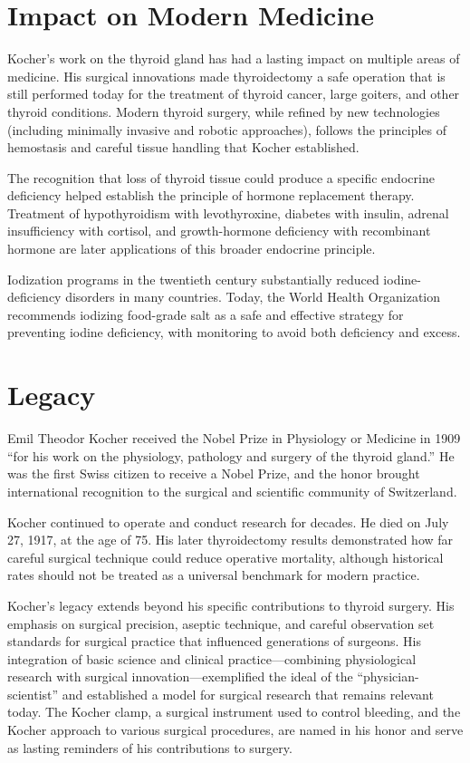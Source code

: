 \section{Impact on Modern Medicine}

Kocher's work on the thyroid gland has had a lasting impact on multiple areas of medicine. His surgical innovations made thyroidectomy a safe operation that is still performed today for the treatment of thyroid cancer, large goiters, and other thyroid conditions. Modern thyroid surgery, while refined by new technologies (including minimally invasive and robotic approaches), follows the principles of hemostasis and careful tissue handling that Kocher established.

The recognition that loss of thyroid tissue could produce a specific endocrine deficiency helped establish the principle of hormone replacement therapy. Treatment of hypothyroidism with levothyroxine, diabetes with insulin, adrenal insufficiency with cortisol, and growth-hormone deficiency with recombinant hormone are later applications of this broader endocrine principle.

Iodization programs in the twentieth century substantially reduced iodine-deficiency disorders in many countries. Today, the World Health Organization recommends iodizing food-grade salt as a safe and effective strategy for preventing iodine deficiency, with monitoring to avoid both deficiency and excess.\cite{who-iodine}

\section{Legacy}

Emil Theodor Kocher received the Nobel Prize in Physiology or Medicine in 1909 ``for his work on the physiology, pathology and surgery of the thyroid gland.'' He was the first Swiss citizen to receive a Nobel Prize, and the honor brought international recognition to the surgical and scientific community of Switzerland.

Kocher continued to operate and conduct research for decades. He died on July 27, 1917, at the age of 75. His later thyroidectomy results demonstrated how far careful surgical technique could reduce operative mortality, although historical rates should not be treated as a universal benchmark for modern practice.

Kocher's legacy extends beyond his specific contributions to thyroid surgery. His emphasis on surgical precision, aseptic technique, and careful observation set standards for surgical practice that influenced generations of surgeons. His integration of basic science and clinical practice---combining physiological research with surgical innovation---exemplified the ideal of the ``physician-scientist'' and established a model for surgical research that remains relevant today. The Kocher clamp, a surgical instrument used to control bleeding, and the Kocher approach to various surgical procedures, are named in his honor and serve as lasting reminders of his contributions to surgery.


